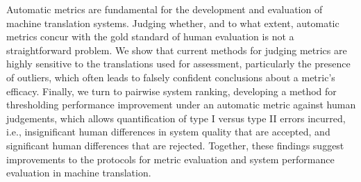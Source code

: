 Automatic metrics are fundamental for the development and evaluation of machine translation systems. Judging whether, and to what extent, automatic metrics concur with the gold standard of human evaluation is not a straightforward problem. We show that current methods for judging metrics are highly sensitive to the translations used for assessment, particularly the presence of outliers, which often leads to falsely confident conclusions about a metric's efficacy. Finally, we turn to pairwise system ranking, developing a method for thresholding performance improvement under an automatic metric against human judgements, which allows quantification of type I versus type II errors incurred, i.e., insignificant human differences in system quality that are accepted, and significant human differences that are rejected. Together, these findings suggest improvements to the protocols for metric evaluation and system performance evaluation in machine translation.
